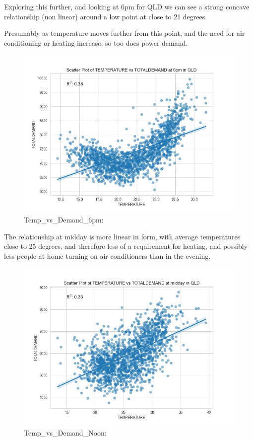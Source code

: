 \documentclass[mstat,12pt]{unswthesis}
\begin{document}
Exploring this further, and looking at 6pm for QLD we can see a strong
concave relationship (non linear) around a low point at close to 21
degrees.

Presumably as temperature moves further from this point, and the need
for air conditioning or heating increase, so too does power demand.

\begin{figure}
\centering
\includegraphics{img/Temp_vs_Demand_6pm.jpg}
\caption{Temp\_vs\_Demand\_6pm:}
\end{figure}

The relationship at midday is more linear in form, with average
temperatures close to 25 degrees, and therefore less of a requirement
for heating, and possibly less people at home turning on air
conditioners than in the evening.

\begin{figure}
\centering
\includegraphics{img/Temp_vs_Demand_Noon.jpg}
\caption{Temp\_vs\_Demand\_Noon:}
\end{figure}
\end{document}
